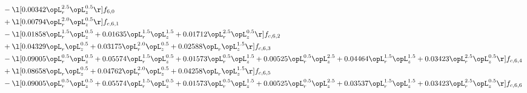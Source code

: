 \begin{alignat}{2}
& - \l[  0.00342 \opL_r^{2.5} \opL_z^{0.5}  \r] f_{6,0} \nonumber \\ 
& + \l[  0.00794 \opL_r^{2.0} \opL_z^{0.5}  \r] f_{c,6,1} \nonumber \\ 
& - \l[  0.01858 \opL_r^{1.5} \opL_z^{0.5} +  0.01635 \opL_r^{1.5} \opL_z^{1.5} +  0.01712 \opL_r^{2.5} \opL_z^{0.5}  \r] f_{c,6,2} \nonumber \\ 
& + \l[  0.04329 \opL_r \opL_z^{0.5} +  0.03175 \opL_r^{2.0} \opL_z^{0.5} +  0.02588 \opL_r \opL_z^{1.5}  \r] f_{c,6,3} \nonumber \\ 
& - \l[  0.09005 \opL_r^{0.5} \opL_z^{0.5} +  0.05574 \opL_r^{1.5} \opL_z^{0.5} +  0.01573 \opL_r^{0.5} \opL_z^{1.5} +  0.00525 \opL_r^{0.5} \opL_z^{2.5} +  0.04464 \opL_r^{1.5} \opL_z^{1.5} +  0.03423 \opL_r^{2.5} \opL_z^{0.5}  \r] f_{c,6,4} \nonumber \\ 
& + \l[  0.08658 \opL_r \opL_z^{0.5} +  0.04762 \opL_r^{2.0} \opL_z^{0.5} +  0.04258 \opL_r \opL_z^{1.5}  \r] f_{c,6,5} \nonumber \\ 
& - \l[  0.09005 \opL_r^{0.5} \opL_z^{0.5} +  0.05574 \opL_r^{1.5} \opL_z^{0.5} +  0.01573 \opL_r^{0.5} \opL_z^{1.5} +  0.00525 \opL_r^{0.5} \opL_z^{2.5} +  0.03537 \opL_r^{1.5} \opL_z^{1.5} +  0.03423 \opL_r^{2.5} \opL_z^{0.5}  \r] f_{c,6,6} \nonumber \\ 
\end{alignat} 



